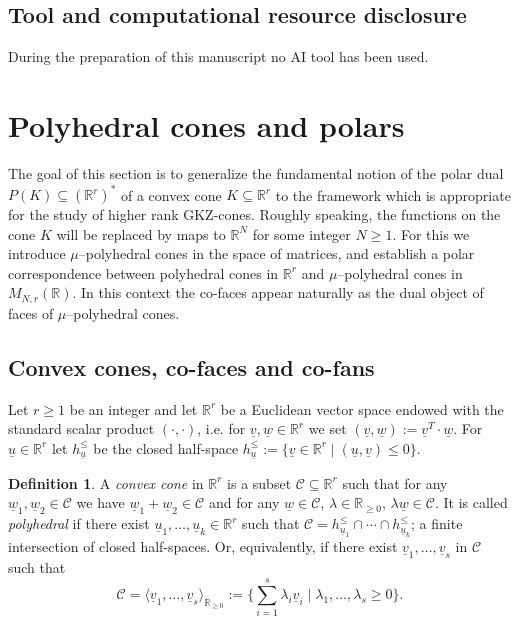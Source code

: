 \documentclass[12pt, a4article]{amsart}   	%
\numberwithin{equation}{section}
\theoremstyle{plain}
\theoremstyle{definition}
\newtheorem{definition}[theorem]{Definition}
\newcommand{\R}{{\mathbb R}}
\newcommand{\mcC}{{\mathcal C}}
\newcommand{\uu}{{\underline u}}
\newcommand{\uv}{{\underline v}}
\newcommand{\uw}{{\underline w}}
\begin{document}
\subsection{\bf Tool and computational resource disclosure} During the preparation of this manuscript no AI tool has been used.

\section{Polyhedral cones and polars}\label{sec:polyhedral:cones:and:polars}

The goal of this section is to generalize the fundamental notion of the polar dual $P(K)\subseteq (\mathbb{R}^r)^*$ of a convex cone $K\subseteq\mathbb{R}^r$ to the framework which is appropriate for the study of higher rank GKZ-cones. Roughly speaking, the functions on the cone $K$ will be replaced by maps to $\mathbb R^N$ for some integer $N\geq 1$. For this we introduce $\mu$--polyhedral cones in the space of matrices, and establish a polar correspondence between polyhedral cones in $\R^r$ and $\mu$--polyhedral cones in $M_{N,r}(\mathbb R)$. In this context the co-faces appear naturally as the dual object of faces of $\mu$--polyhedral cones.

\subsection{Convex cones, co-faces and co-fans}

Let $r\geq 1$ be an integer and let $\mathbb R^r$ be a Euclidean vector space endowed with the standard scalar product $(\cdot,\cdot)$, i.e. for $\uv,\uw\in\mathbb R^r$ we set $(\uv,\uw):=\uv^T\cdot\uw$. For $\uu\in \mathbb{R}^r$ let $h_{ {\uu}}^\leq$ be the closed half-space $h_{ {\uu}}^\leq:=\{\uv \in \mathbb{R}^r\mid (\uu,\uv)\le 0\}$.

\begin{definition}\label{s2_polyhedral}\rm
A \emph{convex cone} in $\mathbb{R}^r$ is a subset $\mcC\subseteq \mathbb{R}^r$ such that for any $\uw_1,\uw_2\in \mcC$ we have $\uw_1+\uw_2\in \mcC$  and for any $\uw\in \mcC$, $\lambda\in \mathbb R_{\ge 0}$, $\lambda \uw\in \mcC$. It is called \emph{polyhedral} if there exist $\uu_1,\ldots,\uu_k\in\mathbb{R}^r$ such that $\mcC=h_{ {\uu_1}}^\leq\cap \cdots\cap h_{ {\uu_k}}^\leq$; a finite intersection of closed half-spaces. Or, equivalently, if there exist $\uv_1,\ldots,\uv_s$ in $\mcC$ such that
\[
\mcC=\langle \uv_1,\ldots, \uv_s\rangle_{\R_ {\geq 0}}:=\{\sum_{i=1}^s \lambda_i \uv_i \mid \lambda_1,\ldots,\lambda_s\ge 0\}.
\]
\end{definition}
\end{document}
